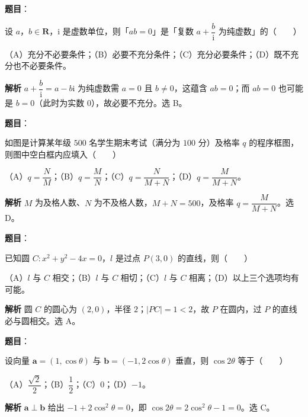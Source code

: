 \begin{answer}

\textbf{题目}：

设 $a$，$b\in\mathbf R$，$\mathrm i$ 是虚数单位，则「$ab=0$」是「复数 $a+\dfrac b{\mathrm i}$ 为纯虚数」的\mbox{（　　）}

（A）充分不必要条件；（B）必要不充分条件；（C）充分必要条件；（D）既不充分也不必要条件。

\textbf{解析}
$a+\dfrac b{\mathrm i}=a-b\mathrm i$ 为纯虚数需 $a=0$ 且 $b\neq0$，这蕴含 $ab=0$；而 $ab=0$ 也可能是 $b=0$（此时为实数 $0$），故必要不充分。选 B。


\end{answer}
\begin{answer}

\textbf{题目}：

如图是计算某年级 $500$ 名学生期末考试（满分为 $100$ 分）及格率 $q$ 的程序框图，则图中空白框内应填入\mbox{（　　）}
\nopagebreak[4]
\begin{center}\end{center}
\nopagebreak[4]
（A）$q=\dfrac NM$；（B）$q=\dfrac MN$；（C）$q=\dfrac N{M+N}$；（D）$q=\dfrac M{M+N}$。

\textbf{解析}
$M$ 为及格人数、$N$ 为不及格人数，$M+N=500$，及格率 $q=\dfrac M{M+N}$。选 D。


\end{answer}
\begin{answer}

\textbf{题目}：

已知圆 $C:x^2+y^2-4x=0$，$l$ 是过点 $P(3,0)$ 的直线，则\mbox{（　　）}

（A）$l$ 与 $C$ 相交；（B）$l$ 与 $C$ 相切；（C）$l$ 与 $C$ 相离；（D）以上三个选项均有可能。

\textbf{解析}
圆 $C$ 的圆心为 $(2,0)$，半径 $2$；$|PC|=1<2$，故 $P$ 在圆内，过 $P$ 的直线必与圆相交。选 A。


\end{answer}
\begin{answer}

\textbf{题目}：

设向量 $\boldsymbol a=(1,\cos\theta)$ 与 $\boldsymbol b=(-1,2\cos\theta)$ 垂直，则 $\cos2\theta$ 等于\mbox{（　　）}

（A）$\dfrac{\sqrt2}2$；（B）$\dfrac12$；（C）$0$；（D）$-1$。

\textbf{解析}
$\boldsymbol a\perp\boldsymbol b$ 给出 $-1+2\cos^2\theta=0$，即 $\cos2\theta=2\cos^2\theta-1=0$。选 C。


\end{answer}
